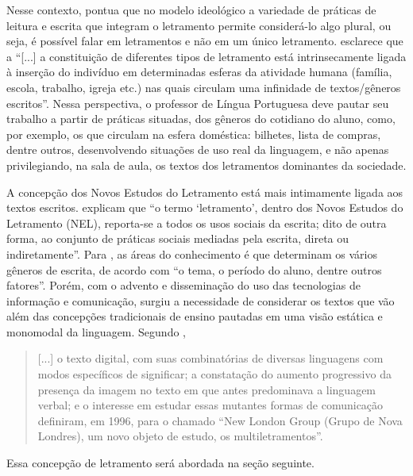 \documentclass{textolivre}
\begin{document}
Nesse contexto, \textcite{street2014} pontua que no modelo ideológico a variedade de
práticas de leitura e escrita que integram o letramento permite considerá-lo
algo plural, ou seja, é possível falar em letramentos e não em um único
letramento. \textcite[p. 53]{terra2020} esclarece que a “[...] a constituição de
diferentes tipos de letramento está intrinsecamente ligada à inserção do
indivíduo em determinadas esferas da atividade humana (família, escola,
trabalho, igreja etc.) nas quais circulam uma infinidade de textos/gêneros
escritos”. Nessa perspectiva, o professor de Língua Portuguesa deve pautar seu
trabalho a partir de práticas situadas, dos gêneros do cotidiano do aluno,
como, por exemplo, os que circulam na esfera doméstica: bilhetes, lista de
compras, dentre outros, desenvolvendo situações de uso real da linguagem, e não
apenas privilegiando, na sala de aula, os textos dos letramentos dominantes da
sociedade.

A concepção dos Novos Estudos do Letramento está mais intimamente ligada aos
textos escritos. \textcite[p. 3]{bragana2016} explicam que “o termo
‘letramento’, dentro dos Novos Estudos do Letramento (NEL), reporta-se a todos
os usos sociais da escrita; dito de outra forma, ao conjunto de práticas
sociais mediadas pela escrita, direta ou indiretamente”. Para \textcite[p. 91]{street2009},
as áreas do conhecimento é que determinam os vários gêneros de escrita, de
acordo com “o tema, o período do aluno, dentre outros fatores”. Porém, com o
advento e disseminação do uso das tecnologias de informação e comunicação,
surgiu a necessidade de considerar os textos que vão além das concepções
tradicionais de ensino pautadas em uma visão estática e monomodal da linguagem.
Segundo \textcite[p. 81]{kleiman2014},
\begin{quote}
[...] o texto digital, com suas combinatórias de diversas linguagens com modos
específicos de significar; a constatação do aumento progressivo da presença da
imagem no texto em que antes predominava a linguagem verbal; e o interesse em
estudar essas mutantes formas de comunicação definiram, em 1996, para o chamado
“New London Group (Grupo de Nova Londres), um novo objeto de estudo, os
multiletramentos”.
\end{quote}

Essa concepção de letramento será abordada na seção seguinte.
\end{document}
